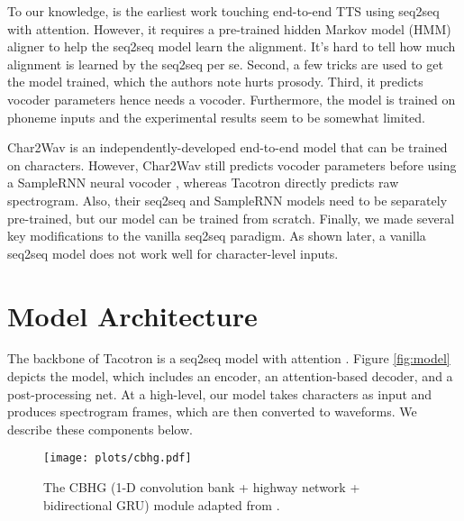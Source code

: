 \documentclass{article} \usepackage{iclr2017_conference,times}
\begin{document}
To our knowledge, \cite{wang2016first} is the earliest work touching end-to-end TTS using seq2seq with attention. However, it requires a pre-trained hidden Markov model (HMM) aligner to help the seq2seq model learn the alignment. It's hard to tell how much alignment is learned by the seq2seq per se. Second, a few tricks are used to get the model trained, which the authors note hurts prosody. Third, it predicts vocoder parameters hence needs a vocoder. Furthermore, the model is trained on phoneme inputs and the experimental results seem to be somewhat limited.

Char2Wav \citep{sotelo2017char2wav} is an independently-developed end-to-end model that can be trained on characters. However, Char2Wav still predicts vocoder parameters before using a SampleRNN neural vocoder \citep{mehri2016samplernn}, whereas Tacotron directly predicts raw spectrogram. Also, their seq2seq and SampleRNN models need to be separately pre-trained, but our model can be trained from scratch. Finally, we made several key modifications to the vanilla seq2seq paradigm. As shown later, a vanilla seq2seq model does not work well for character-level inputs.

\section{Model Architecture}
\label{sec.model}
The backbone of Tacotron is a seq2seq model with attention \citep{bahdanau2014neural, vinyals2015grammar}. Figure \ref{fig:model} depicts the model, which includes an encoder, an attention-based decoder, and a post-processing net. At a high-level, our model takes characters as input and produces spectrogram frames, which are then converted to waveforms. We describe these components below.

\begin{figure}[htp!]
\centering
\texttt{[image: plots/cbhg.pdf]}
\caption{The CBHG (1-D convolution bank + highway network + bidirectional GRU) module adapted from \cite{lee2016fully}.}
\label{fig:cbhg}
\end{figure}
\end{document}
